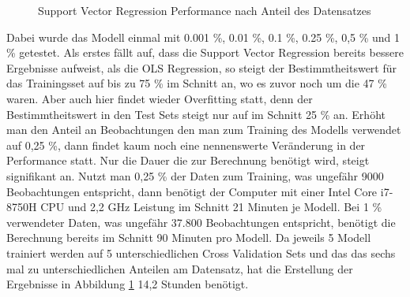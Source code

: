\documentclass[a4paper,12pt]{thesis}
\begin{document}
\begin{figure}%
	\centering
	\qquad
	\caption{Support Vector Regression Performance nach Anteil des Datensatzes}%
	\label{fig:TrainingsShareValidation2}%
\end{figure}

Dabei wurde das Modell einmal mit 0.001 \%, 0.01 \%, 0.1 \%, 0.25 \%, 0,5 \% und 1 \% getestet. Als erstes fällt auf, dass die Support Vector Regression bereits bessere Ergebnisse aufweist, als die OLS Regression, so steigt der Bestimmtheitswert für das Trainingsset auf bis zu 75 \% im Schnitt an, wo es zuvor noch um die 47 \% waren. Aber auch hier findet wieder Overfitting statt, denn der Bestimmtheitswert in den Test Sets steigt nur auf im Schnitt 25 \% an. Erhöht man den Anteil an Beobachtungen den man zum Training des Modells verwendet auf 0,25 \%, dann findet kaum noch eine nennenswerte Veränderung in der Performance statt. Nur die Dauer die zur Berechnung benötigt wird, steigt signifikant an. Nutzt man 0,25 \% der Daten zum Training, was ungefähr 9000 Beobachtungen entspricht, dann benötigt der Computer mit einer Intel Core i7-8750H CPU und 2,2 GHz Leistung im Schnitt 21 Minuten je Modell. Bei 1 \% verwendeter Daten, was ungefähr 37.800 Beobachtungen entspricht, benötigt die Berechnung bereits im Schnitt 90 Minuten pro Modell. Da jeweils 5 Modell trainiert werden auf 5 unterschiedlichen Cross Validation Sets und das das sechs mal zu unterschiedlichen Anteilen am Datensatz, hat die Erstellung der Ergebnisse in Abbildung \ref{fig:TrainingsShareValidation2} 14,2 Stunden benötigt.
\end{document}
